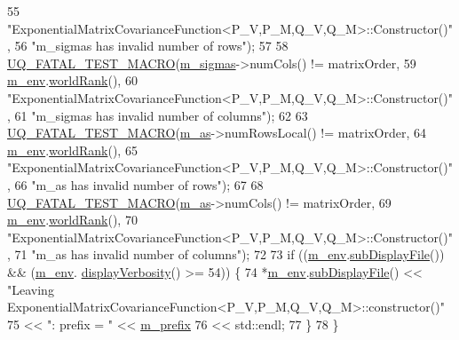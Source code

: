 \begin{DoxyCode}
55                       \textcolor{stringliteral}{"ExponentialMatrixCovarianceFunction<P\_V,P\_M,Q\_V,Q\_M>::Constructor()"},
56                       \textcolor{stringliteral}{"m\_sigmas has invalid number of rows"});
57 
58   \hyperlink{_defines_8h_a56d63d18d0a6d45757de47fcc06f574d}{UQ\_FATAL\_TEST\_MACRO}(\hyperlink{class_q_u_e_s_o_1_1_exponential_matrix_covariance_function_a4da6af8ffd336294a3d7a89c5258099e}{m\_sigmas}->numCols() != matrixOrder,
59                       \hyperlink{class_q_u_e_s_o_1_1_base_matrix_covariance_function_a2bf98f6576db775109e240a2d828c578}{m\_env}.\hyperlink{class_q_u_e_s_o_1_1_base_environment_a78b57112bbd0e6dd0e8afec00b40ffa7}{worldRank}(),
60                       \textcolor{stringliteral}{"ExponentialMatrixCovarianceFunction<P\_V,P\_M,Q\_V,Q\_M>::Constructor()"},
61                       \textcolor{stringliteral}{"m\_sigmas has invalid number of columns"});
62 
63   \hyperlink{_defines_8h_a56d63d18d0a6d45757de47fcc06f574d}{UQ\_FATAL\_TEST\_MACRO}(\hyperlink{class_q_u_e_s_o_1_1_exponential_matrix_covariance_function_a63e36890c98437a802ba59be08fb166b}{m\_as}->numRowsLocal() != matrixOrder,
64                       \hyperlink{class_q_u_e_s_o_1_1_base_matrix_covariance_function_a2bf98f6576db775109e240a2d828c578}{m\_env}.\hyperlink{class_q_u_e_s_o_1_1_base_environment_a78b57112bbd0e6dd0e8afec00b40ffa7}{worldRank}(),
65                       \textcolor{stringliteral}{"ExponentialMatrixCovarianceFunction<P\_V,P\_M,Q\_V,Q\_M>::Constructor()"},
66                       \textcolor{stringliteral}{"m\_as has invalid number of rows"});
67 
68   \hyperlink{_defines_8h_a56d63d18d0a6d45757de47fcc06f574d}{UQ\_FATAL\_TEST\_MACRO}(\hyperlink{class_q_u_e_s_o_1_1_exponential_matrix_covariance_function_a63e36890c98437a802ba59be08fb166b}{m\_as}->numCols() != matrixOrder,
69                       \hyperlink{class_q_u_e_s_o_1_1_base_matrix_covariance_function_a2bf98f6576db775109e240a2d828c578}{m\_env}.\hyperlink{class_q_u_e_s_o_1_1_base_environment_a78b57112bbd0e6dd0e8afec00b40ffa7}{worldRank}(),
70                       \textcolor{stringliteral}{"ExponentialMatrixCovarianceFunction<P\_V,P\_M,Q\_V,Q\_M>::Constructor()"},
71                       \textcolor{stringliteral}{"m\_as has invalid number of columns"});
72 
73   \textcolor{keywordflow}{if} ((\hyperlink{class_q_u_e_s_o_1_1_base_matrix_covariance_function_a2bf98f6576db775109e240a2d828c578}{m\_env}.\hyperlink{class_q_u_e_s_o_1_1_base_environment_a8a0064746ae8dddfece4229b9ad374d6}{subDisplayFile}()) && (\hyperlink{class_q_u_e_s_o_1_1_base_matrix_covariance_function_a2bf98f6576db775109e240a2d828c578}{m\_env}.
      \hyperlink{class_q_u_e_s_o_1_1_base_environment_a1fe5f244fc0316a0ab3e37463f108b96}{displayVerbosity}() >= 54)) \{
74     *\hyperlink{class_q_u_e_s_o_1_1_base_matrix_covariance_function_a2bf98f6576db775109e240a2d828c578}{m\_env}.\hyperlink{class_q_u_e_s_o_1_1_base_environment_a8a0064746ae8dddfece4229b9ad374d6}{subDisplayFile}() << \textcolor{stringliteral}{"Leaving
       ExponentialMatrixCovarianceFunction<P\_V,P\_M,Q\_V,Q\_M>::constructor()"}
75                             << \textcolor{stringliteral}{": prefix = "} << \hyperlink{class_q_u_e_s_o_1_1_base_matrix_covariance_function_a05865387f77ce48e71ab2448982c5616}{m\_prefix}
76                             << std::endl;
77   \}
78 \}
\end{DoxyCode}
